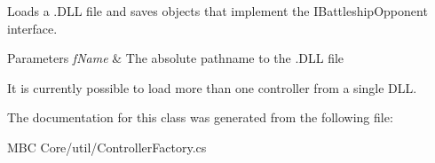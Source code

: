 Loads a .D\-L\-L file and saves objects that implement the I\-Battleship\-Opponent interface.


\begin{DoxyParams}{Parameters}
{\em f\-Name} & The absolute pathname to the .D\-L\-L file\\
\hline
\end{DoxyParams}


It is currently possible to load more than one controller from a single D\-L\-L.

The documentation for this class was generated from the following file\-:\begin{DoxyCompactItemize}
\item 
M\-B\-C Core/util/Controller\-Factory.\-cs\end{DoxyCompactItemize}
